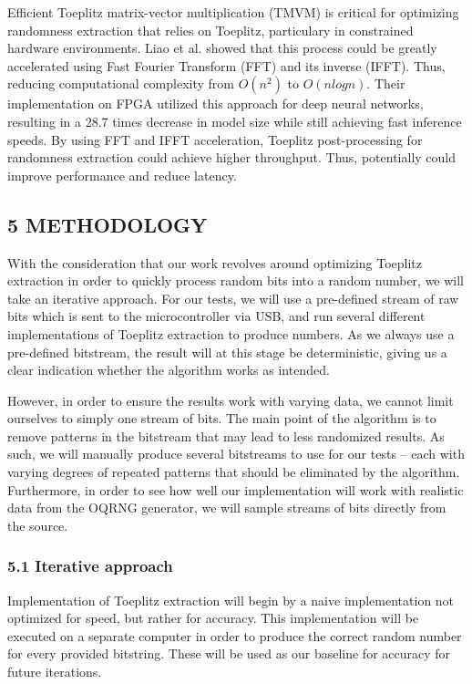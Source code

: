 Efficient Toeplitz matrix-vector multiplication (TMVM) is critical for optimizing randomness extraction that relies on Toeplitz, particulary in constrained hardware environments. Liao et al. \cite{liao} showed that this process could be greatly accelerated using Fast Fourier Transform (FFT) and its inverse (IFFT). Thus, reducing computational complexity from \(O(n^2)\) to \(O(n log n)\). Their implementation on FPGA utilized this approach for deep neural networks, resulting in a 28.7 times decrease in model size while still achieving fast inference speeds. By using FFT and IFFT acceleration, Toeplitz post-processing for randomness extraction could achieve higher throughput. Thus, potentially could improve performance and reduce latency.

\hypertarget{methodology}{%
\subsection{5 METHODOLOGY}\label{methodology}}

With the consideration that our work revolves around optimizing Toeplitz extraction in order to quickly process random bits into a random number, we will take an iterative approach. For our tests, we will use a pre-defined stream of raw bits which is sent to the microcontroller via USB, and run several different implementations of Toeplitz extraction to produce numbers. As we always use a pre-defined bitstream, the result will at this stage be deterministic, giving us a clear indication whether the algorithm works as intended.

However, in order to ensure the results work with varying data, we cannot limit ourselves to simply one stream of bits. The main point of the algorithm is to remove patterns in the bitstream that may lead to less randomized results. As such, we will manually produce several bitstreams to use for our tests -- each with varying degrees of repeated patterns that should be eliminated by the algorithm. Furthermore, in order to see how well our implementation will work with realistic data from the OQRNG generator, we will sample streams of bits directly from the source.

\hypertarget{iterative-approach}{%
\subsubsection{5.1 Iterative approach}\label{iterative-approach}}

Implementation of Toeplitz extraction will begin by a naive implementation not optimized for speed, but rather for accuracy. This implementation will be executed on a separate computer in order to produce the correct random number for every provided bitstring. These will be used as our baseline for accuracy for future iterations.

